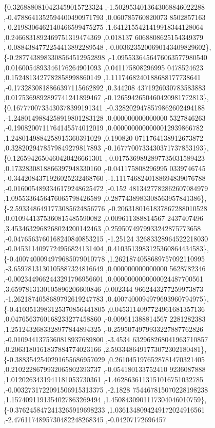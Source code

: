 \begin{DoxyCode}
\{0.3268880810423459015723324 ,-1.5029534013643068846022288 ,-0.4788641352594400490971793 ,0.060785760820073
      8502857163 ,-0.2198306462140466599475275 ,1.6412155421419918344128064 ,0.2466831892469751319474369 ,0.018137
      6068808625154349379 ,-0.0884384772254413892289548 ,-0.0036235200690143409829602\},
\{-0.2877438983308564512952898 ,-1.0955336456476063577980540 ,0.0160054893346176264901093 ,0.041175808296995
      0478524623 ,0.1524813427782858998860149 ,1.1117468240188688177738641 ,-0.1732830818866397115662892 ,0.344208
      4371926030783583883 ,0.0175369892897741241899467 ,-0.1265942650460420981772813\},
\{0.1677700733430378399191341 ,-0.3282029478579862602494188 ,-1.2480149884258919801283128 ,0.000000000000000
      5327846263 ,-0.1908200711764145574012019 ,0.0000000000000012939866782 ,1.2480149884258915360391029 ,0.190820
      0711764138912673872 ,0.3282029478579849279817893 ,-0.1677700733430371737853193\},
\{0.1265942650460420426661301 ,-0.0175369892897735031589423 ,0.1732830818866397948330160 ,-0.041175808296995
      0339746745 ,-0.3442084371926025232468760 ,-1.1117468240188694839076788 ,-0.0160054893346179248625472 ,-0.152
      4813427782862607084979 ,1.0955336456476065798426589 ,0.2877438983308563957841386\},
\{-2.5933486491773085624856776 ,-0.2063180161837867288010528 ,0.0109441375360815485590082 ,0.009611388814567
      2437407496 ,3.4534632968268024200142463 ,0.2595074979933242875773658 ,-0.0476563760168240840853215 ,-1.25124
      32683328964522218030 ,-0.0453114097724956824131404 ,0.4103513983125360864434583\},
\{-0.4007400094979685079010778 ,1.2621874058689757092110995 ,-3.6597813130105887324816649 ,0.000000000000000
      5628782346 ,-0.0023449662443291796956601 ,0.0000000000000024487700561 ,3.6597813130105896206600846 ,0.002344
      9662443277259973873 ,-1.2621874058689792619247783 ,0.4007400094979693960794975\},
\{-0.4103513983125370856441805 ,0.0453114097724961681357136 ,0.0476563760168233277458860 ,-0.009611388814567
      2281282383 ,1.2512432683328977844894325 ,-0.2595074979933227887762826 ,-0.0109441375360818937689800 ,-3.4534
      632968268041963710857 ,0.2063180161837884774023166 ,2.5933486491773072302180481\},
\{-0.3883542540291655686957029 ,0.2610451976528781470321405 ,0.2102228679932065802393737 ,-0.054180133752410
      9236087888 ,1.0120263431941181053730361 ,-1.4628636113151016751032785 ,-0.0032731722091506915313375 ,-2.1828
      754467815070228198238 ,1.1574091191354027863269494 ,1.4508430901117304046010759\},
\{-0.3762458472413265919698233 ,1.0361348094249172024916561 ,-2.4761174895730482248268345 ,-0.04207172696457

\end{DoxyCode}
